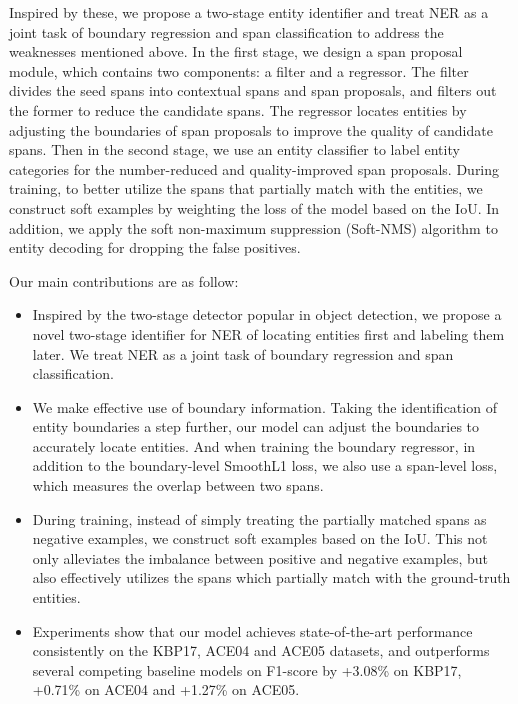 \documentclass[11pt,a4paper]{article}
\begin{document}
Inspired by these, we propose a two-stage entity identifier and treat NER as a joint task of boundary regression and span classification to address the weaknesses mentioned above.
In the first stage, we design a span proposal module, which contains two components: a filter and a regressor. The filter divides the seed spans into contextual spans and span proposals, and filters out the former to reduce the candidate spans. The regressor locates entities by adjusting the boundaries of span proposals to improve the quality of candidate spans. Then in the second stage, we use an entity classifier to label entity categories for the number-reduced and quality-improved span proposals. During training, to better utilize the spans that partially match with the entities, we construct soft examples by weighting the loss of the model based on the IoU. 
In addition, we apply the soft non-maximum suppression (Soft-NMS) \citep{8237855} algorithm to entity decoding for dropping the false positives.


Our main contributions are as follow:

\begin{itemize}
\item Inspired by the two-stage detector popular in object detection, we propose a novel two-stage identifier for NER of locating entities first and labeling them later. We treat NER as a joint task of boundary regression and span classification.
    \item We make effective use of boundary information. Taking the identification of entity boundaries a step further, our model can adjust the boundaries to accurately locate entities. And when training the boundary regressor, in addition to the boundary-level SmoothL1 loss, we also use a span-level loss, which measures the overlap between two spans.
    \item During training, instead of simply treating the partially matched spans as negative examples, we construct soft examples based on the IoU. This not only alleviates the imbalance between positive and negative examples, but also effectively utilizes the spans which partially match with the ground-truth entities.
    \item Experiments show that our model achieves state-of-the-art performance consistently on the KBP17, ACE04 and ACE05 datasets, and outperforms several competing baseline models on F1-score by +3.08\% on KBP17, +0.71\% on ACE04 and +1.27\% on ACE05.
\end{itemize}
\end{document}
